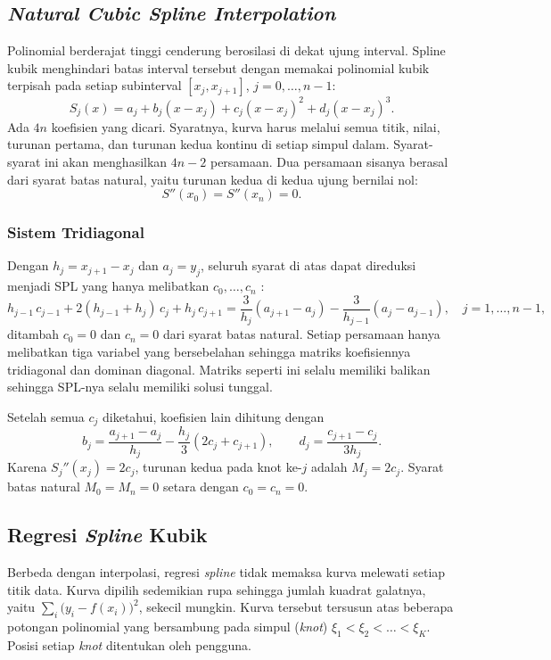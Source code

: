 \subsection{\textit{Natural Cubic Spline Interpolation}}

Polinomial berderajat tinggi cenderung berosilasi di dekat ujung interval. Spline kubik menghindari batas interval tersebut dengan memakai polinomial kubik terpisah pada setiap subinterval $[x_j, x_{j+1}]$, $j = 0, \dots, n-1$:
\[
S_j(x) = a_j + b_j (x - x_j) + c_j (x - x_j)^2 + d_j (x - x_j)^3 .
\]
Ada $4n$ koefisien yang dicari. Syaratnya, kurva harus melalui semua titik, nilai, turunan pertama, dan turunan kedua kontinu di setiap simpul dalam. Syarat-syarat ini akan menghasilkan $4n - 2$ persamaan. Dua persamaan sisanya berasal dari syarat batas natural, yaitu turunan kedua di kedua ujung bernilai nol:
\[
S''(x_0) = S''(x_n) = 0 .
\]

\subsubsection{Sistem Tridiagonal}

Dengan $h_j = x_{j+1} - x_j$ dan $a_j = y_j$, seluruh syarat di atas dapat direduksi menjadi SPL yang hanya melibatkan $c_0, \dots, c_n$ \cite{burden}:
\[
h_{j-1}\, c_{j-1} + 2(h_{j-1} + h_j)\, c_j + h_j\, c_{j+1}
= \frac{3}{h_j}(a_{j+1} - a_j) - \frac{3}{h_{j-1}}(a_j - a_{j-1}),
\quad j = 1, \dots, n-1,
\]
ditambah $c_0 = 0$ dan $c_n = 0$ dari syarat batas natural. Setiap persamaan hanya melibatkan tiga variabel yang bersebelahan sehingga matriks koefisiennya tridiagonal dan dominan diagonal. Matriks seperti ini selalu memiliki balikan sehingga SPL-nya selalu memiliki solusi tunggal.

Setelah semua $c_j$ diketahui, koefisien lain dihitung dengan
\[
b_j = \frac{a_{j+1} - a_j}{h_j} - \frac{h_j}{3}(2c_j + c_{j+1}), \qquad
d_j = \frac{c_{j+1} - c_j}{3h_j} .
\]
Karena $S_j''(x_j) = 2c_j$, turunan kedua pada knot ke-$j$ adalah $M_j = 2c_j$. Syarat batas natural $M_0 = M_n = 0$ setara dengan $c_0 = c_n = 0$.

\subsection{Regresi \textit{Spline} Kubik}

Berbeda dengan interpolasi, regresi \textit{spline} tidak memaksa kurva melewati setiap titik data. Kurva dipilih sedemikian rupa sehingga jumlah kuadrat galatnya, yaitu $\sum_i \bigl(y_i - f(x_i)\bigr)^2$, sekecil mungkin. Kurva tersebut tersusun atas beberapa potongan polinomial yang bersambung pada simpul (\textit{knot}) $\xi_1 < \xi_2 < \dots < \xi_K$. Posisi setiap \textit{knot} ditentukan oleh pengguna.


